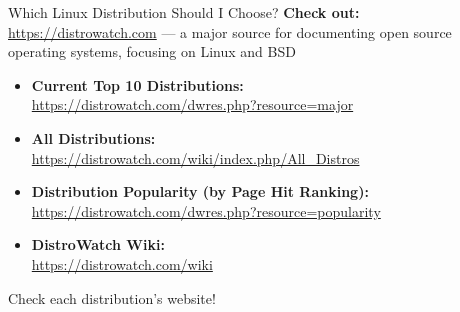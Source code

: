 \documentclass[11pt]{beamer}
\begin{document}
\begin{frame}{Which Linux Distribution Should I Choose?}
	\textbf{Check out:} {\color{blue}\url{https://distrowatch.com}} --- a major source for documenting open source operating systems, focusing on Linux and BSD
	\begin{itemize}
		\item \textbf{Current Top 10 Distributions:} \\\hspace{-5mm} \url{https://distrowatch.com/dwres.php?resource=major}
		\item \textbf{All Distributions:} \\\hspace{-5mm} \url{https://distrowatch.com/wiki/index.php/All_Distros}
		\item \textbf{Distribution Popularity (by Page Hit Ranking):} \\\hspace{-5mm} \url{https://distrowatch.com/dwres.php?resource=popularity}
		\item \textbf{DistroWatch Wiki:} \\\hspace{-5mm} \url{https://distrowatch.com/wiki}
	\end{itemize}
	Check each distribution's website!
\end{frame}
\end{document}
